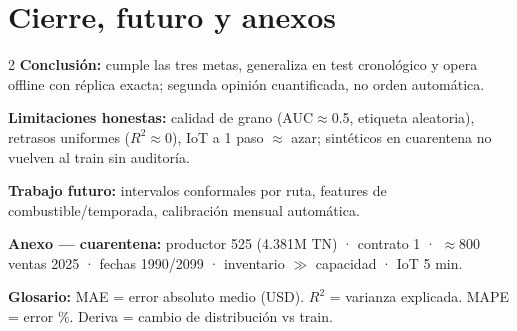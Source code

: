 \documentclass[11pt]{article}
\begin{document}
\section{Cierre, futuro y anexos}
\begin{multicols}{2}
\textbf{Conclusión:} cumple las tres metas, generaliza en test cronológico y opera
offline con réplica exacta; segunda opinión cuantificada, no orden automática.

\textbf{Limitaciones honestas:} calidad de grano (AUC$\approx$0.5, etiqueta aleatoria),
retrasos uniformes ($R^2\approx$0), IoT a 1 paso $\approx$ azar; sintéticos en cuarentena
no vuelven al train sin auditoría.

\textbf{Trabajo futuro:} intervalos conformales por ruta, features de
combustible/temporada, calibración mensual automática.

\textbf{Anexo — cuarentena:} productor 525 (4.381M TN) · contrato 1 ·
$\approx$800 ventas 2025 · fechas 1990/2099 · inventario $\gg$ capacidad · IoT 5 min.

\textbf{Glosario:} MAE = error absoluto medio (USD). $R^2$ = varianza explicada.
MAPE = error \%. Deriva = cambio de distribución vs train.
\end{multicols}
\end{document}
